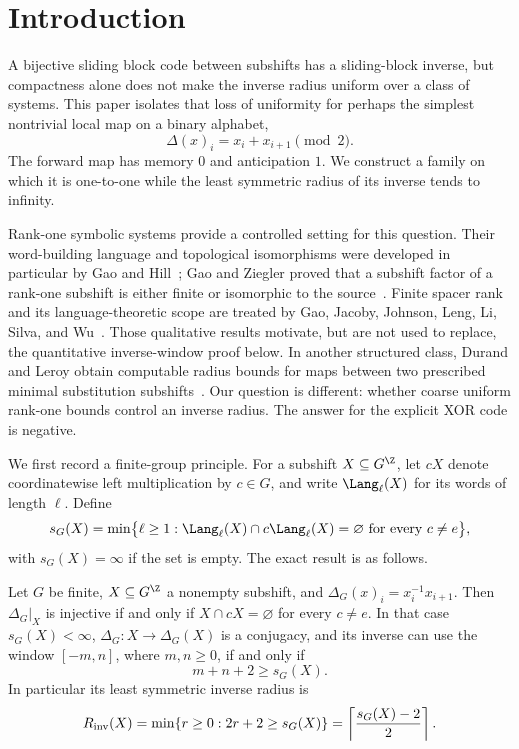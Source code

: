 \section{Introduction}

A bijective sliding block code between subshifts has a sliding-block inverse,
but compactness alone does not make the inverse radius uniform over a class of
systems.  This paper isolates that loss of uniformity for perhaps the simplest
nontrivial local map on a binary alphabet,
\begin{equation}\label{eq:xor-intro}
  \Delta(x)_i=x_i+x_{i+1}\pmod 2.
\end{equation}
The forward map has memory $0$ and anticipation $1$.  We construct a family on
which it is one-to-one while the least symmetric radius of its inverse tends
to infinity.

Rank-one symbolic systems provide a controlled setting for this question.
Their word-building language and topological isomorphisms were developed in
particular by Gao and Hill~\cite{GaoHill2016}; Gao and Ziegler proved that a
subshift factor of a rank-one subshift is either finite or isomorphic to the
source~\cite{GaoZiegler2020}.  Finite spacer rank and its language-theoretic
scope are treated by Gao, Jacoby, Johnson, Leng, Li, Silva, and
Wu~\cite{GaoEtAl2025}.  Those qualitative results motivate, but are not used
to replace, the quantitative inverse-window proof below.  In another
structured class, Durand and Leroy obtain computable radius bounds for maps
between two prescribed minimal substitution subshifts~\cite{DurandLeroy2022}.
Our question is different: whether coarse uniform rank-one bounds control an
inverse radius.  The answer for the explicit XOR code is negative.

We first record a finite-group principle.  For a subshift $X\subseteq G^\Z$,
let $cX$ denote coordinatewise left multiplication by $c\in G$, and write
$\Lang_\ell(X)$ for its words of length $\ell$.  Define
\begin{equation}\label{eq:separation-length-intro}
 s_G(X)=\min\bigl\{\ell\geq 1:
 \Lang_\ell(X)\cap c\Lang_\ell(X)=\varnothing
 \text{ for every }c\neq e\bigr\},
\end{equation}
with $s_G(X)=\infty$ if the set is empty.  The exact result is as follows.

\begin{theorem}\label{thm:finite-group-intro}
Let $G$ be finite, $X\subseteq G^\Z$ a nonempty subshift, and
$\Delta_G(x)_i=x_i^{-1}x_{i+1}$.  Then $\Delta_G|_X$ is injective if and only
if $X\cap cX=\varnothing$ for every $c\neq e$.  In that case $s_G(X)<\infty$,
$\Delta_G:X\to \Delta_G(X)$ is a conjugacy, and its inverse can use the window
$[-m,n]$, where $m,n\geq0$, if and only if
\begin{equation}\label{eq:window-intro}
 m+n+2\geq s_G(X).
\end{equation}
In particular its least symmetric inverse radius is
\begin{equation}\label{eq:radius-intro}
 R_{\rm inv}(X)=\min\{r\geq0:2r+2\geq s_G(X)\}
 =\left\lceil\frac{s_G(X)-2}{2}\right\rceil.
\end{equation}
\end{theorem}

